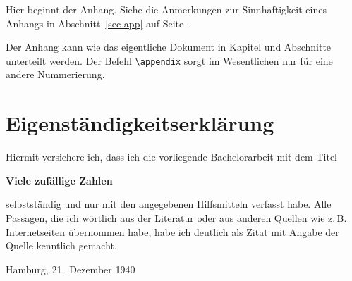 
\printbibliography

\appendix


Hier beginnt der Anhang.  Siehe die Anmerkungen zur Sinnhaftigkeit eines
Anhangs in Abschnitt~\ref{sec-app} auf Seite~\pageref{sec-app}.

Der Anhang kann wie das eigentliche Dokument in Kapitel und Abschnitte
unterteilt werden.  Der Befehl \verb|\appendix| sorgt im Wesentlichen nur für
eine andere Nummerierung.

\clearpage

\thispagestyle{empty}

\section*{Eigenständigkeitserklärung}

Hiermit versichere ich, dass ich die vorliegende Bachelorarbeit mit dem Titel
\begin{center}
  \textbf{Viele zufällige Zahlen}
\end{center}
selbstständig und nur mit den angegebenen Hilfsmitteln verfasst habe.  Alle
Passagen, die ich wörtlich aus der Literatur oder aus anderen Quellen wie
z.\,B. Internetseiten übernommen habe, habe ich deutlich als Zitat mit Angabe
der Quelle kenntlich gemacht.

\vspace{2cm}

Hamburg, 21.\ Dezember 1940
